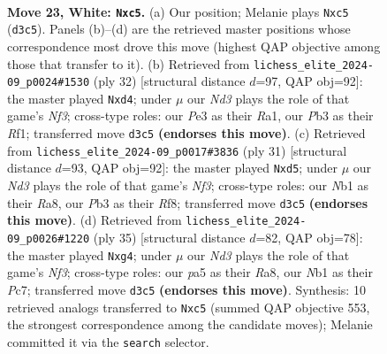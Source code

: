 \documentclass[11pt]{article}
\begin{document}
\clearpage

\begin{figure}[p]\centering
\begin{subfigure}{0.46\textwidth}\centering
\resizebox{\linewidth}{!}{%
\newchessgame
\chessboard[
  setfen={5rk1/3brppp/1n2pn2/p1q5/6P1/1P1NP3/P3BRPP/RN4K1 w - - 0 23},
  showmover=false,
  pgfstyle=straightmove, color=movearrow, markmove={d3-c5}
]}
\caption{}
\end{subfigure}\hfill
\begin{subfigure}{0.46\textwidth}\centering
\resizebox{\linewidth}{!}{%
\newchessgame
\chessboard[
  setfen={r1b2rk1/1p3ppp/p7/8/Pn1q4/5NP1/4PPBP/R4RK1 w - - 0 17},
  showmover=false,
  pgfstyle=straightmove, color=movearrow, markmove={f3-d4}
]}
\caption{}
\end{subfigure}
\\[4pt]
\begin{subfigure}{0.46\textwidth}\centering
\resizebox{\linewidth}{!}{%
\newchessgame
\chessboard[
  setfen={r4rk1/pp3pbp/5np1/3Q2B1/8/5N2/PP3PPP/R4RK1 b - - 0 16},
  showmover=false,
  pgfstyle=straightmove, color=movearrow, markmove={f6-d5}
]}
\caption{}
\end{subfigure}\hfill
\begin{subfigure}{0.46\textwidth}\centering
\resizebox{\linewidth}{!}{%
\newchessgame
\chessboard[
  setfen={r2r4/2p1bpkp/p1p2np1/4p3/4P1Q1/1PP1B3/P1N2PPP/R3R1K1 b - - 0 18},
  showmover=false,
  pgfstyle=straightmove, color=movearrow, markmove={f6-g4}
]}
\caption{}
\end{subfigure}
\caption{\textbf{Move 23, White: \texttt{Nxc5}.} (a) Our position; Melanie plays \texttt{Nxc5} (\texttt{d3c5}). Panels (b)--(d) are the retrieved master positions whose correspondence most drove this move (highest QAP objective among those that transfer to it). (b) Retrieved from \texttt{lichess\_elite\_2024-09\_p0024\#1530} (ply 32) [structural distance $d$=97, QAP obj=92]: the master played \texttt{Nxd4}; under $\mu$ our \emph{Nd3} plays the role of that game's \emph{Nf3}; cross-type roles: our \emph{P}e3 as their \emph{R}a1, our \emph{P}b3 as their \emph{R}f1; transferred move \texttt{d3c5} \textbf{(endorses this move)}. (c) Retrieved from \texttt{lichess\_elite\_2024-09\_p0017\#3836} (ply 31) [structural distance $d$=93, QAP obj=92]: the master played \texttt{Nxd5}; under $\mu$ our \emph{Nd3} plays the role of that game's \emph{Nf3}; cross-type roles: our \emph{N}b1 as their \emph{R}a8, our \emph{P}b3 as their \emph{R}f8; transferred move \texttt{d3c5} \textbf{(endorses this move)}. (d) Retrieved from \texttt{lichess\_elite\_2024-09\_p0026\#1220} (ply 35) [structural distance $d$=82, QAP obj=78]: the master played \texttt{Nxg4}; under $\mu$ our \emph{Nd3} plays the role of that game's \emph{Nf3}; cross-type roles: our \emph{p}a5 as their \emph{R}a8, our \emph{N}b1 as their \emph{P}c7; transferred move \texttt{d3c5} \textbf{(endorses this move)}. Synthesis: 10 retrieved analogs transferred to \texttt{Nxc5} (summed QAP objective 553, the strongest correspondence among the candidate moves); Melanie committed it via the \texttt{search} selector.}
\label{fig:thought-m44}
\end{figure}
\end{document}
